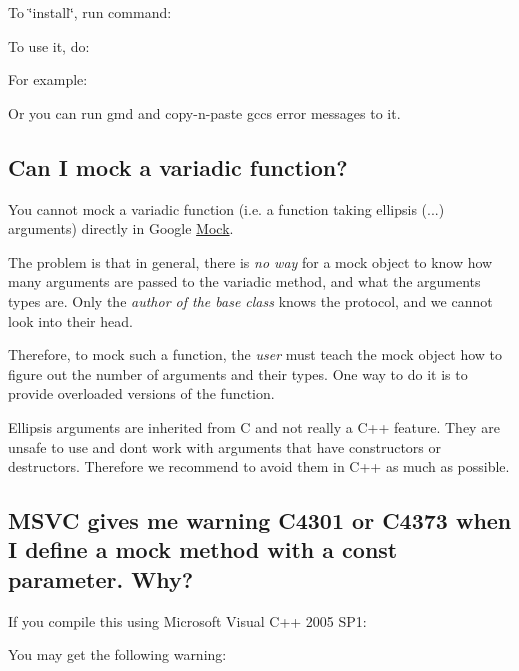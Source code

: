 To \char`\"{}install\char`\"{}, run command\+: 
\begin{DoxyCode}{0}
\end{DoxyCode}


To use it, do\+: 
\begin{DoxyCode}{0}
\end{DoxyCode}


For example\+: 
\begin{DoxyCode}{0}
\end{DoxyCode}


Or you can run {\ttfamily gmd} and copy-\/n-\/paste gcc\textquotesingle{}s error messages to it.

\subsection*{Can I mock a variadic function?}

You cannot mock a variadic function (i.\+e. a function taking ellipsis ({\ttfamily ...}) arguments) directly in Google \mbox{\hyperlink{classMock}{Mock}}.

The problem is that in general, there is {\itshape no way} for a mock object to know how many arguments are passed to the variadic method, and what the arguments\textquotesingle{} types are. Only the {\itshape author of the base class} knows the protocol, and we cannot look into their head.

Therefore, to mock such a function, the {\itshape user} must teach the mock object how to figure out the number of arguments and their types. One way to do it is to provide overloaded versions of the function.

Ellipsis arguments are inherited from C and not really a C++ feature. They are unsafe to use and don\textquotesingle{}t work with arguments that have constructors or destructors. Therefore we recommend to avoid them in C++ as much as possible.

\subsection*{M\+S\+VC gives me warning C4301 or C4373 when I define a mock method with a const parameter. Why?}

If you compile this using Microsoft Visual C++ 2005 S\+P1\+: 
\begin{DoxyCode}{0}
\DoxyCodeLine{\};}
\DoxyCodeLine{}
\DoxyCodeLine{\};}
\end{DoxyCode}
 You may get the following warning\+: 
\begin{DoxyCode}{0}
\end{DoxyCode}


